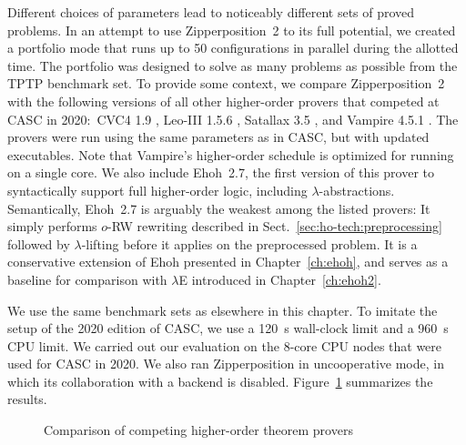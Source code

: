 Different choices of
parameters lead to noticeably different sets of proved problems. In an attempt
to use Zipperposition~2 to its full potential, we created a portfolio mode
that runs up to 50 configurations in parallel during the allotted time. The portfolio
was designed to solve as many problems as possible from the TPTP benchmark set. To
provide some context, we compare Zipperposition~2 with the following versions of
all other higher-order provers that competed at CASC in 2020:\ CVC4 1.9
\cite{cbetal-11-cvc4}, Leo-III 1.5.6 \cite{sb-21-leo3}, Satallax 3.5
\cite{cb-12-satallax}, and Vampire 4.5.1 \cite{br-20-full-sup-w-combs}.
The provers were run using the same parameters as in CASC, but with updated
executables.
Note that
Vampire's higher-order schedule is optimized for running on a single core.
We also include Ehoh~2.7, the first version of this prover to syntactically support
full higher-order logic, including $\lambda$-abstractions.
Semantically, Ehoh~2.7 is arguably the weakest among the listed provers:
It simply performs $o$-RW rewriting described in Sect.~\ref{sec:ho-tech:preprocessing} followed by
$\lambda$-lifting before it applies \relax{\lfsup{}} \cite{bbcw-21-lfho}
on the preprocessed problem. It is a conservative extension of Ehoh presented in Chapter~\ref{ch:ehoh},
and serves as a baseline for comparison with $\lambda$E introduced in Chapter~\ref{ch:ehoh2}.

We use the same benchmark sets as elsewhere in this chapter. To imitate the
setup of the 2020 edition of CASC, we use a 120~s wall-clock limit and a 960~s CPU limit.
We carried out our evaluation on the 8-core CPU nodes that were used for
CASC in 2020. We also ran Zipperposition in uncooperative mode, in which its
collaboration with a backend is disabled. Figure~\ref{fig:other-provers}
summarizes the results.

\begin{figure}[t]
  \centering
  \def\arraystretch{1.1}%
  \caption{Comparison of competing higher-order theorem provers}
  \label{fig:other-provers}
\end{figure}

